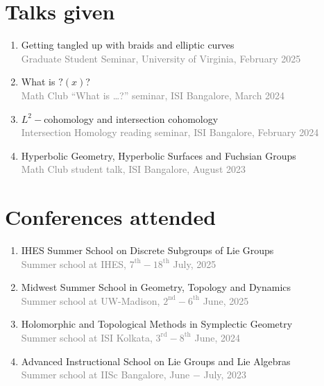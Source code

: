 \documentclass[a4paper, oneside, final]{scrartcl} %
\begin{document}
\section{Talks given}

\begin{enumerate}[label = $\bullet$]
  \item Getting tangled up with braids and elliptic curves \\
    \textcolor{grey}{Graduate Student Seminar, University of Virginia, February 2025}
  \item What is \( ?(x) \)? \\
    \textcolor{grey}{Math Club ``What is \dots ?'' seminar, ISI Bangalore, March 2024}
  \item \( L^2- \)cohomology and intersection cohomology \\
    \textcolor{grey}{Intersection Homology reading seminar, ISI Bangalore, February 2024}
  \item Hyperbolic Geometry, Hyperbolic Surfaces and Fuchsian Groups \\
    \textcolor{grey}{Math Club student talk, ISI Bangalore, August 2023}
\end{enumerate}

\section{Conferences attended}

\begin{enumerate}[label = $\bullet$]
  \item IHES Summer School on Discrete Subgroups of Lie Groups\\
    \textcolor{grey}{Summer school at IHES, \( {7}^{\text{th}} -  {18}^{\text{th}} \) July, 2025}
  \item Midwest Summer School in Geometry, Topology and Dynamics  \\
    \textcolor{grey}{Summer school at UW-Madison, \( {2}^{\text{nd}} -  {6}^{\text{th}} \) June, 2025}
  \item Holomorphic and Topological Methods in Symplectic Geometry \\
    \textcolor{grey}{Summer school at ISI Kolkata, \( {3}^{\text{rd}} -  {8}^{\text{th}} \) June, 2024}
  \item Advanced Instructional School on Lie Groups and Lie Algebras \\
    \textcolor{grey}{Summer school at IISc Bangalore, June \( - \) July, 2023}
\end{enumerate}
\end{document}
